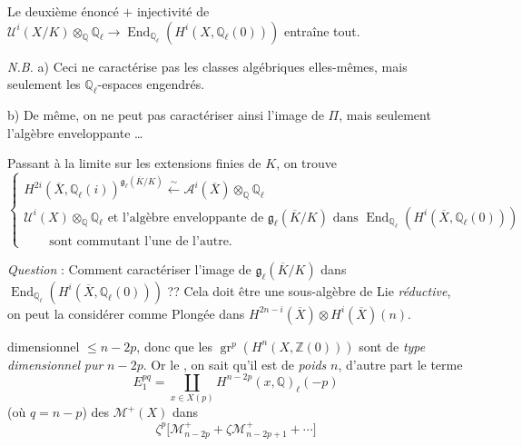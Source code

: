 \documentclass[11pt,a4paper]{article}
\begin{document}
Le deuxième énoncé $+$ injectivité de $\mathcal{U}^{i}(X/K) \otimes_{\mathbb{Q}} \mathbb{Q}_{\ell} \longrightarrow \operatorname{End}_{\mathbb{Q}_{\ell}}(H^{i}(X, \mathbb{Q}_{\ell}(0)))$ entraîne tout.

\emph{N.B.} a) Ceci ne caractérise pas les classes algébriques elles-mêmes, mais seulement les $\mathbb{Q}_{\ell}$-espaces engendrés.

b) De même, on ne peut pas caractériser ainsi l'image de $\Pi$, mais seulement l'algèbre enveloppante \ldots

Passant à la limite sur les extensions finies de $K$, on trouve
\[
  \begin{cases}
    H^{2i}(\overline{X}, \mathbb{Q}_{\ell}(i))^{\mathfrak{g}_{\ell}(\overline{K}/K)} \xleftarrow{\ \sim\ } \mathcal{A}^{i}(\overline{X}) \otimes_{\mathbb{Q}} \mathbb{Q}_{\ell} \\
    \mathcal{U}^{i}(X) \otimes_{\mathbb{Q}} \mathbb{Q}_{\ell} \text{ et l'algèbre enveloppante de } \mathfrak{g}_{\ell}(\overline{K}/K) \text{ dans } \operatorname{End}_{\mathbb{Q}_{\ell}}(H^{i}(\overline{X}, \mathbb{Q}_{\ell}(0))) \\
    \qquad \text{sont commutant l'une de l'autre.}
  \end{cases}
\]

\emph{Question} : Comment caractériser l'image de $\mathfrak{g}_{\ell}(\overline{K}/K)$ dans $\operatorname{End}_{\mathbb{Q}_{\ell}}(H^{i}(\overline{X}, \mathbb{Q}_{\ell}(0)))$ ?? Cela doit être une sous-algèbre de Lie \emph{réductive}, on peut la considérer comme Plongée dans $H^{2n-i}(\overline{X}) \otimes H^{i}(\overline{X})(n)$.

dimensionnel $\leq n-2p$, donc que les $\operatorname{gr}^{p}(H^{n}(X, \mathbb{Z}(0)))$ sont \struck{\ill{}} de \emph{type dimensionnel} \emph{pur} $n-2p$. Or le \ill{} \ill{}, on sait qu'il est de \emph{poids} $n$, d'autre part le terme
\[
  E_{1}^{pq} = \coprod_{x \in X(p)} H^{n-2p}(x, \mathbb{Q})_{\ell}(-p)
\]
(où $q = n-p$)  des \struck{\ill{}} $\mathcal{M}^{+}(X)$ \ill{} dans
\[
  \zeta^{p}\bigl[\mathcal{M}^{+}_{n-2p} + \zeta \mathcal{M}^{+}_{n-2p+1} + \cdots\bigr]
\]
\end{document}
